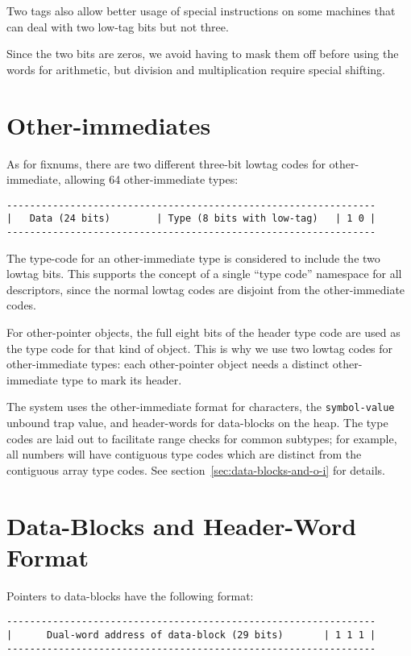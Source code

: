 Two tags also allow better usage of special instructions on some machines that
can deal with two low-tag bits but not three.

Since the two bits are zeros, we avoid having to mask them off before using the
words for arithmetic, but division and multiplication require special shifting.



\section{Other-immediates}
\label{sec:other-immediates}



As for fixnums, there are two different three-bit lowtag codes for
other-immediate, allowing 64 other-immediate types:
\begin{verbatim}
----------------------------------------------------------------
|   Data (24 bits)        | Type (8 bits with low-tag)   | 1 0 |
----------------------------------------------------------------
\end{verbatim}

The type-code for an other-immediate type is considered to include the two
lowtag bits.  This supports the concept of a single ``type code'' namespace for
all descriptors, since the normal lowtag codes are disjoint from the
other-immediate codes.

For other-pointer objects, the full eight bits of the header type code are used
as the type code for that kind of object.  This is why we use two lowtag codes
for other-immediate types: each other-pointer object needs a distinct
other-immediate type to mark its header.

The system uses the other-immediate format for characters, 
the {\tt symbol-value} unbound trap value, and header-words for data-blocks on
the heap.  The type codes are laid out to facilitate range checks for common
subtypes; for example, all numbers will have contiguous type codes which are
distinct from the contiguous array type codes.  See
section~\ref{sec:data-blocks-and-o-i}
for details.


\section{Data-Blocks and Header-Word Format}
\label{sec:data-blocks-and-header}

Pointers to data-blocks have the following format:
\begin{verbatim}
----------------------------------------------------------------
|      Dual-word address of data-block (29 bits)       | 1 1 1 |
----------------------------------------------------------------
\end{verbatim}

